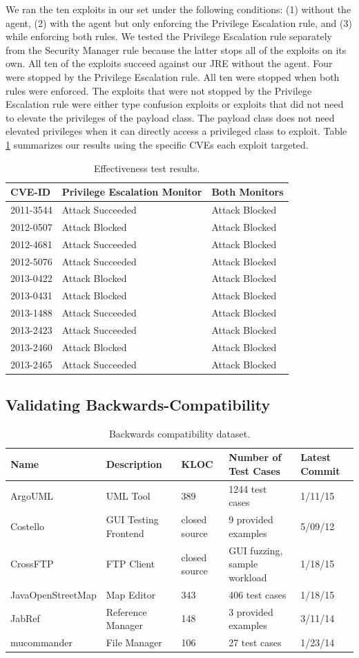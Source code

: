 \documentclass{sig-alternate}
\begin{document}
We ran the ten exploits in our set under the following conditions:
(1) without the agent, (2) with the agent but only enforcing the Privilege
Escalation rule, and (3) while enforcing both rules. We tested the Privilege Escalation rule separately from the Security Manager rule because the latter stops all of the exploits on its own. All
ten of the exploits succeed against our JRE without the agent. Four
were stopped by the Privilege Escalation rule. All ten were stopped
when both rules were enforced. The exploits that were not stopped
by the Privilege Escalation rule were either type confusion exploits
or exploits that did not need to elevate the privileges of the payload
class. The payload class does not need elevated privileges when it
can directly access a privileged class to exploit. Table \ref{tab:Exploit-experiment-summary}
summarizes our results using the specific CVEs each exploit targeted.

\begin{table}
\caption{Effectiveness test results.}\label{tab:Exploit-experiment-summary}
\begin{tabular}{l>{\raggedright}p{3cm}l}
\toprule 
\textbf{CVE-ID} & \textbf{Privilege Escalation Monitor} & \textbf{Both Monitors}\tabularnewline
\midrule
2011-3544 & Attack Succeeded  & Attack Blocked\tabularnewline
2012-0507 & Attack Blocked & Attack Blocked\tabularnewline
2012-4681 & Attack Succeeded  & Attack Blocked\tabularnewline
2012-5076 & Attack Succeeded  & Attack Blocked\tabularnewline
2013-0422 & Attack Blocked & Attack Blocked\tabularnewline
2013-0431 & Attack Blocked & Attack Blocked\tabularnewline
2013-1488 & Attack Succeeded  & Attack Blocked\tabularnewline
2013-2423 & Attack Succeeded  & Attack Blocked\tabularnewline
2013-2460 & Attack Blocked & Attack Blocked\tabularnewline
2013-2465 & Attack Succeeded  & Attack Blocked\tabularnewline
\bottomrule
\end{tabular}
\end{table}

\subsection{Validating Backwards-Compatibility}\label{sec:backcompat}
\begin{table}
\caption{\label{tab:validation-programs}
Backwards compatibility dataset.}
\centering

\begin{tabular}{lllll}
\toprule 
\textbf{Name} & \textbf{Description} & \textbf{KLOC} & \textbf{Number of Test Cases} & \textbf{Latest Commit}\tabularnewline
\midrule
ArgoUML & UML Tool & 389 & 1244 test cases & 1/11/15 \tabularnewline
Costello & GUI Testing Frontend & closed source & 9 provided examples & 5/09/12 \tabularnewline
CrossFTP & FTP Client & closed source & GUI fuzzing, sample workload & 1/18/15 \tabularnewline
JavaOpenStreetMap & Map Editor & 343 & 406 test cases & 1/18/15 \tabularnewline
JabRef & Reference Manager & 148 & 3 provided examples & 3/11/14 \tabularnewline 
mucommander & File Manager & 106 & 27 test cases & 1/23/14 \tabularnewline
\bottomrule
\end{tabular}
\vspace{-0.5cm}
\end{table}
\end{document}
